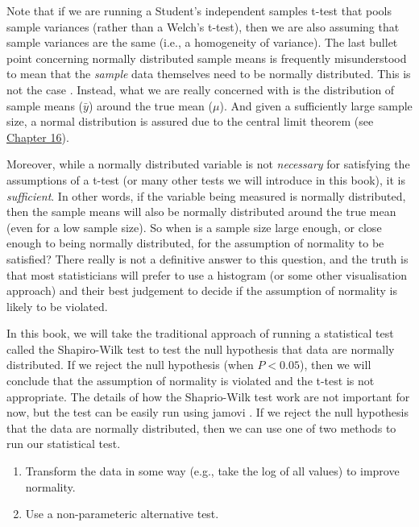 \documentclass[
]{scrbook}
\providecommand{\tightlist}{%
  \setlength{\itemsep}{0pt}\setlength{\parskip}{0pt}}
\begin{document}
Note that if we are running a Student's independent samples t-test that pools sample variances (rather than a Welch's t-test), then we are also assuming that sample variances are the same (i.e., a homogeneity of variance).
The last bullet point concerning normally distributed sample means is frequently misunderstood to mean that the \emph{sample} data themselves need to be normally distributed.
This is not the case \citep{Johnson1995, Lumley2002}.
Instead, what we are really concerned with is the distribution of sample means (\(\bar{y}\)) around the true mean (\(\mu\)).
And given a sufficiently large sample size, a normal distribution is assured due to the central limit theorem (see \protect\hyperlink{Chapter_16}{Chapter 16}).

Moreover, while a normally distributed variable is not \emph{necessary} for satisfying the assumptions of a t-test (or many other tests we will introduce in this book), it is \emph{sufficient}.
In other words, if the variable being measured is normally distributed, then the sample means will also be normally distributed around the true mean (even for a low sample size).
So when is a sample size large enough, or close enough to being normally distributed, for the assumption of normality to be satisfied?
There really is not a definitive answer to this question, and the truth is that most statisticians will prefer to use a histogram (or some other visualisation approach) and their best judgement to decide if the assumption of normality is likely to be violated.

In this book, we will take the traditional approach of running a statistical test called the Shapiro-Wilk test to test the null hypothesis that data are normally distributed.
If we reject the null hypothesis (when \(P < 0.05\)), then we will conclude that the assumption of normality is violated and the t-test is not appropriate.
The details of how the Shaprio-Wilk test work are not important for now, but the test can be easily run using jamovi \citep{Jamovi2022}.
If we reject the null hypothesis that the data are normally distributed, then we can use one of two methods to run our statistical test.

\begin{enumerate}
\def\labelenumi{\arabic{enumi}.}
\tightlist
\item
  Transform the data in some way (e.g., take the log of all values) to improve normality.
\item
  Use a non-parameteric alternative test.
\end{enumerate}
\end{document}
